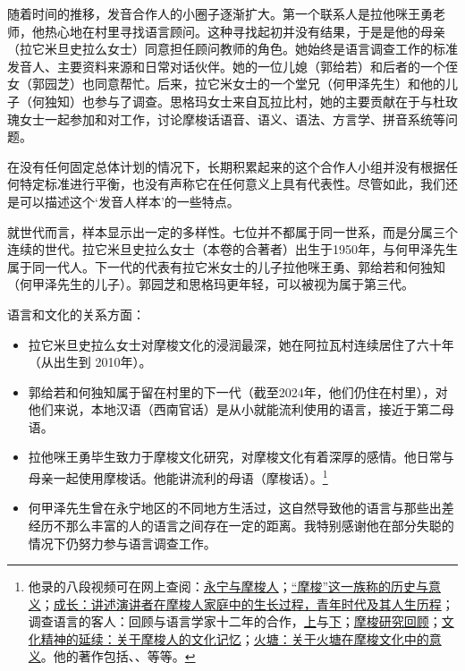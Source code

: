 随着时间的推移，发音合作人的小圈子逐渐扩大。第一个联系人是拉他咪王勇老师，他热心地在村里寻找语言顾问。这种寻找起初并没有结果，于是是他的母亲（拉它米旦史拉么女士）同意担任顾问教师的角色。她始终是语言调查工作的标准发音人、主要资料来源和日常对话伙伴。她的一位儿媳（郭给若）和后者的一个侄女（郭园芝）也同意帮忙。后来，拉它米女士的一个堂兄（何甲泽先生）和他的儿子（何独知）也参与了调查。思格玛女士来自瓦拉比村，她的主要贡献在于与杜玫瑰女士一起参加和对工作，讨论摩梭话语音、语义、语法、方言学、拼音系统等问题。

在没有任何固定总体计划的情况下，长期积累起来的这个合作人小组并没有根据任何特定标准进行平衡，也没有声称它在任何意义上具有代表性。尽管如此，我们还是可以描述这个‘发音人样本’的一些特点。

就世代而言，样本显示出一定的多样性。七位并不都属于同一世系，而是分属三个连续的世代。拉它米旦史拉么女士（本卷的合著者）出生于1950年，与何甲泽先生属于同一代人。下一代的代表有拉它米女士的儿子拉他咪王勇、郭给若和何独知（何甲泽先生的儿子）。郭园芝和思格玛更年轻，可以被视为属于第三代。

语言和文化的关系方面：

\begin{itemize}
    \item 拉它米旦史拉么女士对摩梭文化的浸润最深，她在阿拉瓦村连续居住了六十年（从出生到 2010年）。
    \item 郭给若和何独知属于留在村里的下一代（截至2024年，他们仍住在村里），对他们来说，本地汉语（西南官话）是从小就能流利使用的语言，接近于第二母语。
    \item 拉他咪王勇毕生致力于摩梭文化研究，对摩梭文化有着深厚的感情。他日常与母亲一起使用摩梭话。他能讲流利的母语（摩梭话）。\footnote{他录的八段视频可在网上查阅：\href{https://doi.org/10.24397/pangloss-0007734}{永宁与摩梭人}；\href{https://doi.org/10.24397/pangloss-0007740}{“摩梭”这一族称的历史与意义}；\href{https://doi.org/10.24397/pangloss-0007730}{成长：讲述演讲者在摩梭人家庭中的生长过程，青年时代及其人生历程}；调查语言的客人：回顾与语言学家十二年的合作，\href{https://doi.org/10.24397/pangloss-0007736}{上}与\href{https://doi.org/10. 24397/pangloss-0007738}{下}；\href{https://doi.org/10.24397/pangloss-0007742}{摩梭研究回顾}；\href{https://doi.org/10.24397/pangloss-0007728}{文化精神的延续：关于摩梭人的文化记忆}；\href{https://doi.org/10.24397/pangloss-0007732}{火塘：关于火塘在摩梭文化中的意义}。他的著作包括\textcite{latami2006}、\textcite{latami2009}、\textcite{latami2016}等等。} %
    \item 何甲泽先生曾在永宁地区的不同地方生活过，这自然导致他的语言与那些出差经历不那么丰富的人的语言之间存在一定的距离。我特别感谢他在部分失聪的情况下仍努力参与语言调查工作。
\end{itemize}


